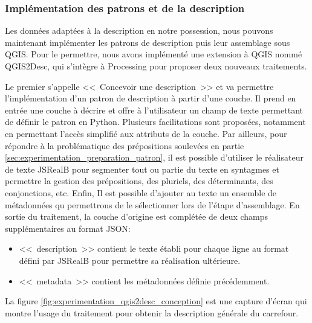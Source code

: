 \subsubsection{Implémentation des patrons et de la description}

\label{sec:experimentation_implémentation_patron}

Les données adaptées à la description en notre possession, nous pouvons maintenant implémenter les patrons de description puis leur assemblage sous QGIS. Pour le permettre, nous avons implémenté une extension à QGIS nommé QGIS2Desc, qui s'intègre à Processing pour proposer deux nouveaux traitements.

\newpar{}

Le premier s'appelle <<~Concevoir une description~>> et va permettre l'implémentation d'un patron de description à partir d'une couche. Il prend en entrée une couche à décrire et offre à l'utilisateur un champ de texte permettant de définir le patron en Python. Plusieurs facilitations sont proposées, notamment en permettant l'accès simplifié aux attributs de la couche. Par ailleurs, pour répondre à la problématique des prépositions soulevées en partie \ref{sec:experimentation_preparation_patron}, il est possible d'utiliser le réalisateur de texte JSRealB \citep{molins2015} pour segmenter tout ou partie du texte en syntagmes et permettre la gestion des prépositions, des pluriels, des déterminants, des conjonctions, etc. Enfin, Il est possible d'ajouter au texte un ensemble de métadonnées qu permettrons de le sélectionner lors de l'étape d'assemblage. En sortie du traitement, la couche d'origine est complétée de deux champs supplémentaires au format JSON:

\begin{itemize}
    \item <<~description~>> contient le texte établi pour chaque ligne au format défini par JSRealB pour permettre sa réalisation ultérieure.
    \item <<~metadata~>> contient les métadonnées définie précédemment.
\end{itemize}

La figure \ref{fig:experimentation_qgis2desc_conception} est une capture d'écran qui montre l'usage du traitement pour obtenir la description générale du carrefour.

